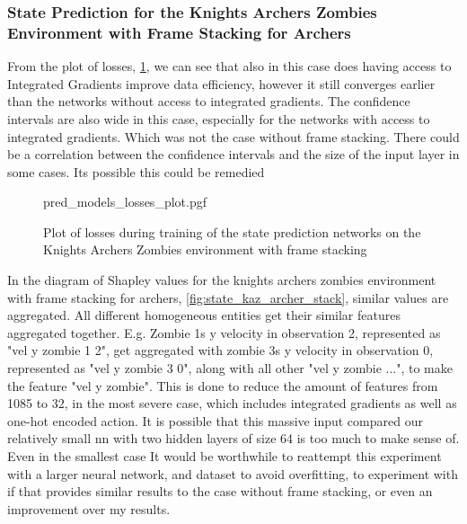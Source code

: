 \documentclass[UKenglish]{uiomasterthesis}
\begin{document}
\subsubsection{State Prediction for the Knights Archers Zombies Environment with Frame Stacking for Archers}

From the plot of losses, \cref{fig:pred_losses_kaz_archer_stack}, we can see that also in this case does having access to Integrated Gradients improve data efficiency, however it still converges earlier than the networks without access to integrated gradients. The confidence intervals are also wide in this case, especially for the networks with access to integrated gradients. Which was not the case without frame stacking. There could be a correlation between the confidence intervals and the size of the input layer in some cases. Its possible this could be remedied  

\begin{figure}[H]
    \centering
    {pred_models_losses_plot.pgf}
    \caption{Plot of losses during training of the state prediction networks on the Knights Archers Zombies environment with frame stacking}
	\label{fig:pred_losses_kaz_archer_stack}
\end{figure}

In the diagram of Shapley values for the knights archers zombies environment with frame stacking for archers, \cref{fig:state_kaz_archer_stack}, similar values are aggregated. All different homogeneous entities get their similar features aggregated together. E.g. Zombie 1s y velocity in observation 2, represented as "vel y zombie 1 2", get aggregated with zombie 3s y velocity in observation 0, represented as "vel y zombie 3 0", along with all other "vel y zombie ...", to make the feature "vel y zombie". This is done to reduce the amount of features from 1085 to 32, in the most severe case, which includes integrated gradients as well as one-hot encoded action. 
It is possible that this massive input compared our relatively small \ac{nn} with two hidden layers of size 64 is too much to make sense of. Even in the smallest case  It would be worthwhile to reattempt this experiment with a larger neural network, and dataset to avoid overfitting, to experiment with if that provides similar results to the case without frame stacking, or even an improvement over my results.
\end{document}
